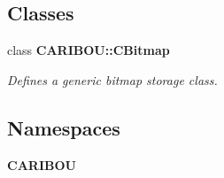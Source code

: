 \subsection*{Classes}
\begin{DoxyCompactItemize}
\item 
class {\bf C\+A\+R\+I\+B\+O\+U\+::\+C\+Bitmap}
\begin{DoxyCompactList}\small\item\em Defines a generic bitmap storage class. \end{DoxyCompactList}\end{DoxyCompactItemize}
\subsection*{Namespaces}
\begin{DoxyCompactItemize}
\item 
 {\bf C\+A\+R\+I\+B\+OU}
\end{DoxyCompactItemize}
